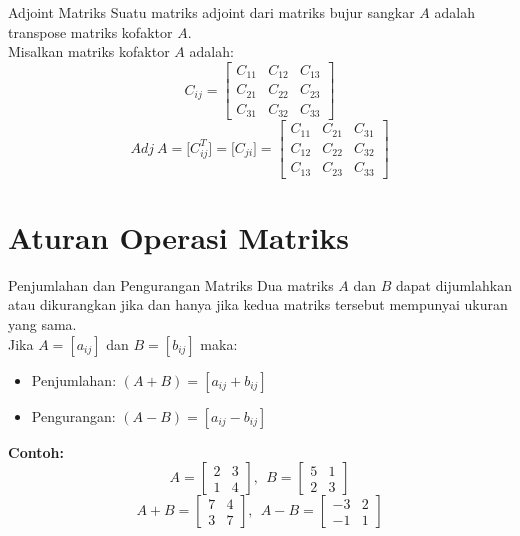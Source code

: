 \documentclass{beamer}
\begin{document}
\begin{frame}[t,fragile]{Adjoint Matriks}
Suatu matriks adjoint dari matriks bujur sangkar $A$ adalah transpose matriks kofaktor $A$. \\
Misalkan matriks kofaktor $A$ adalah:
$$ C_{ij} = \begin{bmatrix}
            C_{11} & C_{12} & C_{13} \\
            C_{21} & C_{22} & C_{23} \\
            C_{31} & C_{32} & C_{33}
            \end{bmatrix} $$
$$ Adj~A = \bigl[ C_{ij}^T \bigr] = \bigl[ C_{ji} \bigr] =  \begin{bmatrix}
                                                            C_{11} & C_{21} & C_{31} \\
                                                            C_{12} & C_{22} & C_{32} \\
                                                            C_{13} & C_{23} & C_{33}
                                                            \end{bmatrix} $$
\end{frame}

\section{Aturan Operasi Matriks}	
\begin{frame}[t,fragile]{Penjumlahan dan Pengurangan Matriks}
Dua matriks $A$ dan $B$ dapat dijumlahkan atau dikurangkan jika dan hanya jika kedua matriks tersebut mempunyai ukuran yang sama.\\
\vspace{0.3cm}
Jika $A = [a_{ij}]$ dan $B = [b_{ij}]$ maka:
\begin{itemize}
\item Penjumlahan: $(A + B) = [a_{ij} + b_{ij}]$
\item Pengurangan: $(A - B) = [a_{ij} - b_{ij}]$
\end{itemize}
\vspace{0.3cm}
\textbf{Contoh:}\\
$$ A = \begin{bmatrix}
       	2 & 3 \\
	    1 & 4
        \end{bmatrix}, ~~ B = \begin{bmatrix}
       	5 & 1 \\
	    2 & 3
        \end{bmatrix} $$
$$ A + B = \begin{bmatrix}
       	7 & 4 \\
	    3 & 7
        \end{bmatrix}, ~~ A - B = \begin{bmatrix}
       	-3 & 2 \\
	    -1 & 1
        \end{bmatrix} $$
\end{frame}
\end{document}
